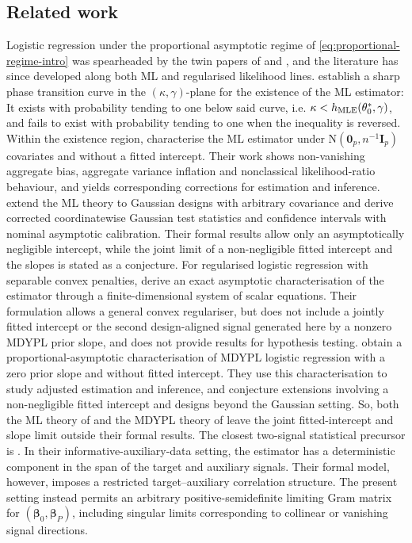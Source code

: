 \documentclass{article}
\theoremstyle{definition}
\newcommand*{\bb}{\boldsymbol}
\def\bbeta{\bb{\beta}}
\begin{document}
\begin{bibunit}
\subsection{Related work}
\label{subsec:related}
Logistic regression under the proportional asymptotic regime of
\eqref{eq:proportional-regime-intro} was spearheaded by the twin papers of 
\citet{candes+sur:2020} and \citet{sur+candes:2019}, and the literature has
since developed along both ML and regularised likelihood
lines. 
\citet{candes+sur:2020} establish a sharp phase transition  curve in the $(\kappa,\gamma)$-plane for the existence
of the ML estimator: It exists with probability tending to one
below said curve, i.e. 
$\kappa<h_{\mathrm{\tiny MLE}}(\theta_0^*,\gamma)$, 
and fails to exist with probability tending to one when the inequality is
reversed.
Within the existence region, \citet{sur+candes:2019} characterise the ML
estimator under $\mathrm{N}(\bb{0}_p, n^{-1}\bb I_p)$ covariates and without a fitted
intercept. Their work shows non-vanishing aggregate bias, aggregate variance
inflation and nonclassical likelihood-ratio behaviour, and yields
corresponding corrections for estimation and inference.
\citet{zhao+etal:2022} extend the ML theory to Gaussian
designs with arbitrary covariance and derive corrected coordinatewise
Gaussian test statistics and confidence intervals with nominal asymptotic
calibration. Their formal
results allow only an asymptotically negligible intercept, while the joint
limit of a non-negligible fitted intercept and the slopes is stated as a
conjecture.
For regularised logistic regression with separable convex penalties,
\citet{salehi+et+al:2019} derive an exact asymptotic characterisation of the
estimator through a finite-dimensional system of scalar equations. Their
formulation allows a general convex regulariser, but does not include a
jointly fitted intercept or the second design-aligned signal generated here
by a nonzero MDYPL prior slope, and does not provide results for hypothesis testing. 
\citet{sterzinger+kosmidis:2026} obtain a proportional-asymptotic characterisation of MDYPL logistic regression with
a zero prior slope and without fitted intercept. They use this
characterisation to study adjusted estimation and inference, and conjecture
extensions involving a non-negligible fitted intercept and designs beyond
the Gaussian setting. So, both the ML theory of
\citet{zhao+etal:2022} and the MDYPL theory of
\citet{sterzinger+kosmidis:2026} leave the joint fitted-intercept and slope
limit outside their formal results. 
The closest two-signal statistical precursor is
\citet{li+huang:2024}. In their informative-auxiliary-data setting, the
estimator has a deterministic component in the span of the target and
auxiliary signals. Their formal model, however, imposes a restricted
target--auxiliary correlation structure. The present setting instead permits
an arbitrary positive-semidefinite limiting Gram matrix for
$(\bbeta_0,\bbeta_P)$, including singular limits corresponding to collinear
or vanishing signal directions.


\end{bibunit}
\end{document}
